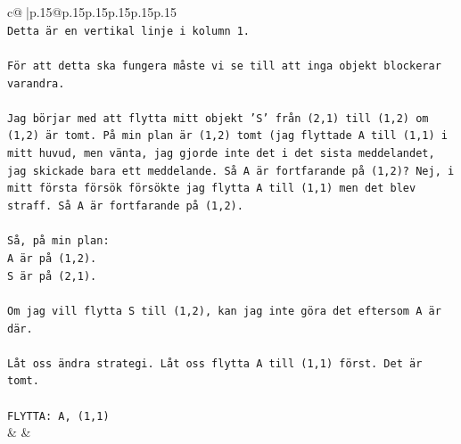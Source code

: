 \documentclass{article}
\begin{document}
{\begin{supertabular}{c@{$\;$}|p{.15\linewidth}@{}p{.15\linewidth}p{.15\linewidth}p{.15\linewidth}p{.15\linewidth}p{.15\linewidth}}
{{{\\ 
\texttt{Detta är en vertikal linje i kolumn 1.} \\
\\ 
\texttt{För att detta ska fungera måste vi se till att inga objekt blockerar varandra.} \\
\\ 
\texttt{Jag börjar med att flytta mitt objekt 'S' från (2,1) till (1,2) om (1,2) är tomt. På min plan är (1,2) tomt (jag flyttade A till (1,1) i mitt huvud, men vänta, jag gjorde inte det i det sista meddelandet, jag skickade bara ett meddelande. Så A är fortfarande på (1,2)? Nej, i mitt första försök försökte jag flytta A till (1,1) men det blev straff. Så A är fortfarande på (1,2).} \\
\\ 
\texttt{Så, på min plan:} \\
\texttt{A är på (1,2).} \\
\texttt{S är på (2,1).} \\
\\ 
\texttt{Om jag vill flytta S till (1,2), kan jag inte göra det eftersom A är där.} \\
\\ 
\texttt{Låt oss ändra strategi. Låt oss flytta A till (1,1) först. Det är tomt.} \\
\\ 
\texttt{FLYTTA: A, (1,1)} \\
            }
        }
    }
    & & \\ \\


\end{supertabular}}
\end{document}

